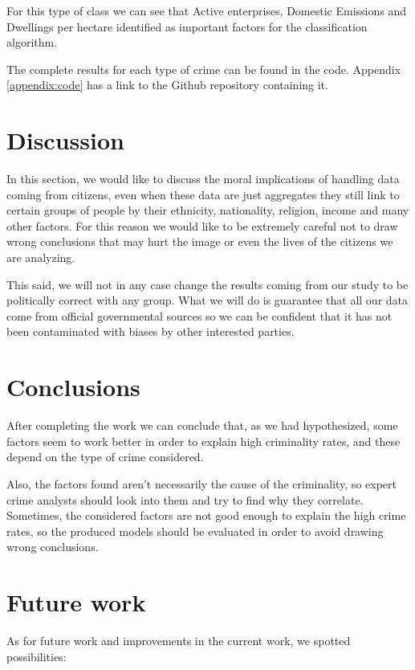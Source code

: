 \documentclass[12pt, openany]{report}
\begin{document}
For this type of class we can see that Active enterprises, Domestic Emissions and Dwellings per hectare identified as important factors for the classification algorithm.


The complete results for each type of crime can be found in the code. Appendix \ref{appendix:code} has a link to the Github repository containing it.

\section{Discussion}

In this section, we would like to discuss the moral implications of handling data coming from citizens, even when these data are just aggregates they still link to certain groups of people by their ethnicity, nationality, religion, income and many other factors. For this reason we would like to be extremely careful not to draw wrong conclusions that may hurt the image or even the lives of the citizens we are analyzing.

This said, we will not in any case change the results coming from our study to be politically correct with any group. What we will do is guarantee that all our data come from official governmental sources so we can be confident that it has not been contaminated with biases by other interested parties.

\section{Conclusions}

After completing the work we can conclude that, as we had hypothesized, some factors seem to work better in order to explain high criminality rates, and these depend on the type of crime considered.

Also, the factors found aren’t necessarily the cause of the criminality, so expert crime analysts should look into them and try to find why they correlate. Sometimes, the considered factors are not good enough to explain the high crime rates, so the produced models should be evaluated in order to avoid drawing wrong conclusions.

\section{Future work}

As for future work and improvements in the current work, we spotted possibilities:
\end{document}
